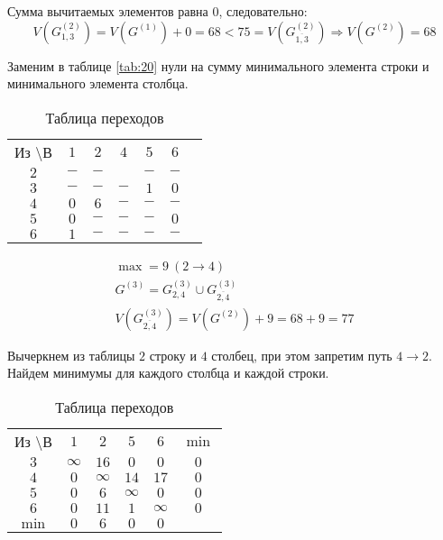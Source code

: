 Сумма вычитаемых элементов равна $0$, следовательно:
\begin{equation*}
V(G_{1,3}^{(2)}) = V(G^{(1)}) + 0 = 68 < 75 = V(G_{\overline{1,3}}^{(2)}) \Rightarrow V(G^{(2)}) = 68
\end{equation*}

Заменим в таблице \ref{tab:20} нули на сумму минимального элемента строки и минимального элемента столбца.

\begin{table}[H]
\begin{center}
	\def\tabcolsep{15pt}
	\caption{Таблица переходов}
	\label{tab:22}
	\begin{tabular}{|c||c|c|c|c|c|c|}
		\hline
		Из \textbackslash В & $1$ & $2$ & $4$ & $5$ & $6$ \\
		\hhline{|=#=|=|=|=|=|}
		$2$ & $-$ & $-$ & \redbold{$9$} & $-$ & $-$ \\
		\hline
		$3$ & $-$ & $-$ & $-$ & $1$ & $0$ \\ 
		\hline
		$4$ & $0$ & $6$ & $-$ & $-$ & $-$ \\
		\hline
		$5$ & $0$ & $-$ & $-$ & $-$ & $0$ \\
		\hline
		$6$ & $1$ & $-$ & $-$ & $-$ & $-$ \\
		\hline 
	\end{tabular}
\end{center}
\end{table}

\vspace{-1cm}
\begin{gather*}
\max = 9\ (2 \rightarrow 4) \\
G^{(3)} = G_{2,4}^{(3)} \cup G_{\overline{2,4}}^{(3)} \\
V(G_{\overline{2,4}}^{(3)}) = V(G^{(2)}) + 9 = 68 + 9 = 77
\end{gather*}

Вычеркнем из таблицы $2$ строку и $4$ столбец, при этом запретим путь $4 \rightarrow 2$. Найдем минимумы для каждого столбца и каждой строки.

\begin{table}[H]
\begin{center}
	\def\tabcolsep{15pt}
	\caption{Таблица переходов}
	\label{tab:23}
	\begin{tabular}{|c||c|c|c|c|c|}
		\hline
		Из \textbackslash В & $1$ & $2$ & $5$ & $6$ & $\min$ \\
		\hhline{|=#=|=|=|=|=|}
		$3$ & $\infty$ & $16$ & $0$ & $0$ & $0$  \\ 
		\hline
		$4$ & $0$ & $\infty$ & $14$ & $17$ & $0$  \\
		\hline
		$5$ & $0$ & $6$ & $\infty$ & $0$ & $0$  \\
		\hline
		$6$ & $0$ & $11$ & $1$ & $\infty$ & $0$  \\ 
		\hhline{|=#=|=|=|=|=|}
		$\min$ & $0$ & $6$ & $0$ & $0$ & \\
		\hline 
	\end{tabular}
\end{center}
\end{table}

